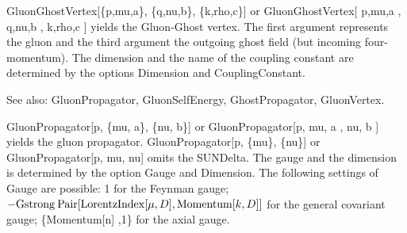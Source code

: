 

GluonGhostVertex[\{p,mu,a\}, \{q,nu,b\}, \{k,rho,c\}] or GluonGhostVertex[ p,mu,a , q,nu,b , k,rho,c ] yields the Gluon-Ghost vertex. The
  first argument represents the gluon and the third argument the outgoing ghost field (but incoming four-momentum). The dimension and the
  name of the coupling constant are determined by the options Dimension and CouplingConstant.

See also: GluonPropagator, GluonSelfEnergy, GhostPropagator, GluonVertex.


















GluonPropagator[p, \{mu, a\}, \{nu, b\}] or GluonPropagator[p, mu, a , nu, b ] yields the gluon propagator. GluonPropagator[p, \{mu\},
  \{nu\}] or GluonPropagator[p, mu, nu] omits the SUNDelta. The gauge and the dimension is determined by the option Gauge and Dimension.
  The following settings of Gauge are possible: 1 for the Feynman gauge; \(-\mathrm{Gstrong}\> \mathrm{Pair}[\mathrm{LorentzIndex}[\mu
,D],\mathrm{Momentum}[k,D]]\) for the general covariant gauge; \{Momentum[n] ,1\} for the axial gauge.

